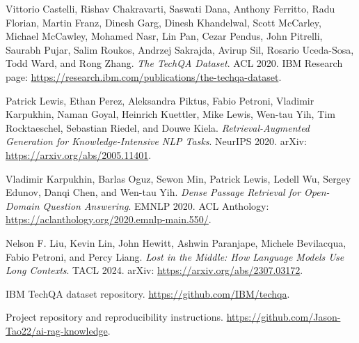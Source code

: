 \documentclass[paper=a4, fontsize=11pt]{scrartcl}
\begin{document}
\begin{enumerate}[label={[\arabic*]}, leftmargin=*]
    \item Vittorio Castelli, Rishav Chakravarti, Saswati Dana, Anthony Ferritto, Radu Florian, Martin Franz, Dinesh Garg, Dinesh Khandelwal, Scott McCarley, Michael McCawley, Mohamed Nasr, Lin Pan, Cezar Pendus, John Pitrelli, Saurabh Pujar, Salim Roukos, Andrzej Sakrajda, Avirup Sil, Rosario Uceda-Sosa, Todd Ward, and Rong Zhang. \textit{The TechQA Dataset}. ACL 2020. IBM Research page: \url{https://research.ibm.com/publications/the-techqa-dataset}.
    \item Patrick Lewis, Ethan Perez, Aleksandra Piktus, Fabio Petroni, Vladimir Karpukhin, Naman Goyal, Heinrich Kuettler, Mike Lewis, Wen-tau Yih, Tim Rocktaeschel, Sebastian Riedel, and Douwe Kiela. \textit{Retrieval-Augmented Generation for Knowledge-Intensive NLP Tasks}. NeurIPS 2020. arXiv: \url{https://arxiv.org/abs/2005.11401}.
    \item Vladimir Karpukhin, Barlas Oguz, Sewon Min, Patrick Lewis, Ledell Wu, Sergey Edunov, Danqi Chen, and Wen-tau Yih. \textit{Dense Passage Retrieval for Open-Domain Question Answering}. EMNLP 2020. ACL Anthology: \url{https://aclanthology.org/2020.emnlp-main.550/}.
    \item Nelson F. Liu, Kevin Lin, John Hewitt, Ashwin Paranjape, Michele Bevilacqua, Fabio Petroni, and Percy Liang. \textit{Lost in the Middle: How Language Models Use Long Contexts}. TACL 2024. arXiv: \url{https://arxiv.org/abs/2307.03172}.
    \item IBM TechQA dataset repository. \url{https://github.com/IBM/techqa}.
    \item Project repository and reproducibility instructions. \url{https://github.com/Jason-Tao22/ai-rag-knowledge}.
\end{enumerate}
\end{document}
